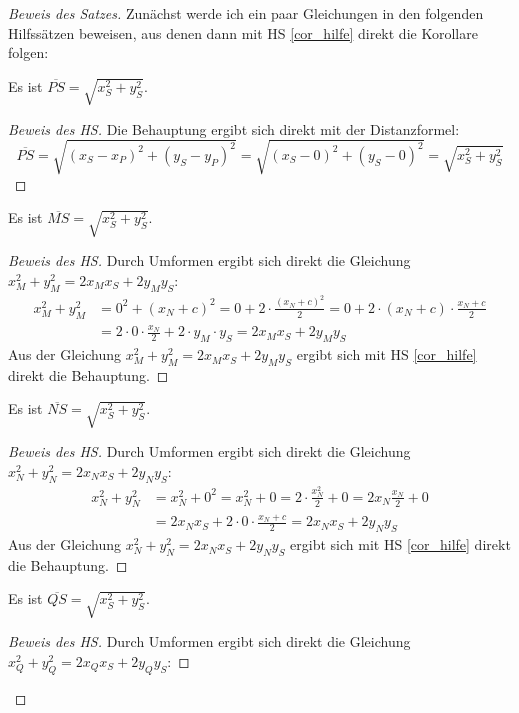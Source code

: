 \begin{proof}[Beweis des Satzes]
    Zunächst werde ich ein paar Gleichungen in den folgenden Hilfssätzen beweisen, aus denen dann mit HS 
    \ref{cor_hilfe}
    direkt die Korollare folgen:
    \begin{lem}\label{no_P}
        Es ist $\overline{PS}=\sqrt{x_S^2+y_S^2}$.
    \end{lem}
    \begin{proof}[Beweis des HS]
        Die Behauptung ergibt sich direkt mit der Distanzformel:
        \[
        \overline{PS}=\sqrt{(x_S-x_P)^2+(y_S-y_P)^2}=\sqrt{(x_S-0)^2+(y_S-0)^2}=\sqrt{x_S^2+y_S^2}    
        \]
    \end{proof}
    \begin{lem}\label{no_M}
        Es ist $\overline{MS}=\sqrt{x_S^2+y_S^2}$.
    \end{lem}
    \begin{proof}[Beweis des HS]
        Durch Umformen ergibt sich direkt die Gleichung $x_M^2+y_M^2=2x_Mx_S+2y_My_S$:
        \begin{align*}
            x_M^2+y_M^2&=0^2+(x_N+c)^2=0+2\cdot \frac{(x_N+c)^2}{2}=0+2\cdot (x_N+c)\cdot\frac{x_N+c}{2}\\
            &=2\cdot 0\cdot \frac{x_N}{2}+2\cdot y_M\cdot y_S=2x_Mx_S+2y_My_S
        \end{align*}
        Aus der Gleichung $x_M^2+y_M^2=2x_Mx_S+2y_My_S$ ergibt sich mit HS \ref{cor_hilfe} direkt die Behauptung.
    \end{proof}
    \begin{lem}\label{no_N}
        Es ist $\overline{NS}=\sqrt{x_S^2+y_S^2}$.
    \end{lem}
    \begin{proof}[Beweis des HS]
        Durch Umformen ergibt sich direkt die Gleichung $x_N^2+y_N^2=2x_Nx_S+2y_Ny_S$:
        \begin{align*}
            x_N^2+y_N^2&=x_N^2+0^2=x_N^2+0=2\cdot \frac{x_N^2}{2}+0=2x_N\frac{x_N}{2}+0\\
            &=2x_Nx_S+2\cdot 0\cdot \frac{x_N+c}{2}=2x_Nx_S+2y_Ny_S
        \end{align*}
        Aus der Gleichung $x_N^2+y_N^2=2x_Nx_S+2y_Ny_S$ ergibt sich mit HS \ref{cor_hilfe} direkt die Behauptung.
    \end{proof}
    \begin{lem}\label{no_Q}
        Es ist $\overline{QS}=\sqrt{x_S^2+y_S^2}$.
    \end{lem}
    \begin{proof}[Beweis des HS]
        Durch Umformen ergibt sich direkt die Gleichung $x_Q^2+y_Q^2=2x_Qx_S+2y_Qy_S$:

\end{proof}
\end{proof}

